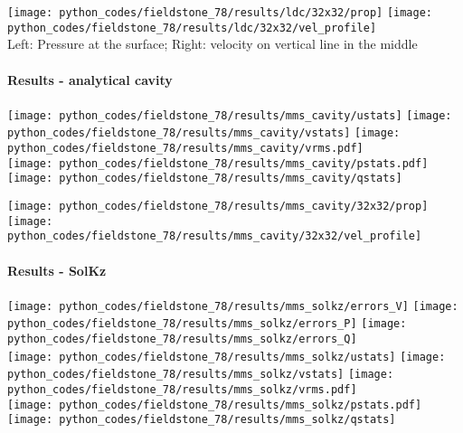 \begin{center}
\texttt{[image: python\_codes/fieldstone\_78/results/ldc/32x32/prop]}
\texttt{[image: python\_codes/fieldstone\_78/results/ldc/32x32/vel\_profile]}\\
{\captionfont Left: Pressure at the surface; Right: velocity on vertical line in the middle}
\end{center}

\newpage
\paragraph{Results - analytical cavity}

\begin{center}
\texttt{[image: python\_codes/fieldstone\_78/results/mms\_cavity/ustats]}
\texttt{[image: python\_codes/fieldstone\_78/results/mms\_cavity/vstats]}
\texttt{[image: python\_codes/fieldstone\_78/results/mms\_cavity/vrms.pdf]}\\
\texttt{[image: python\_codes/fieldstone\_78/results/mms\_cavity/pstats.pdf]}
\texttt{[image: python\_codes/fieldstone\_78/results/mms\_cavity/qstats]}
\end{center}

\begin{center}
\texttt{[image: python\_codes/fieldstone\_78/results/mms\_cavity/32x32/prop]}
\texttt{[image: python\_codes/fieldstone\_78/results/mms\_cavity/32x32/vel\_profile]}
\end{center}


\newpage
\paragraph{Results - SolKz}

\begin{center}
\texttt{[image: python\_codes/fieldstone\_78/results/mms\_solkz/errors\_V]}
\texttt{[image: python\_codes/fieldstone\_78/results/mms\_solkz/errors\_P]}
\texttt{[image: python\_codes/fieldstone\_78/results/mms\_solkz/errors\_Q]}\\
\texttt{[image: python\_codes/fieldstone\_78/results/mms\_solkz/ustats]}
\texttt{[image: python\_codes/fieldstone\_78/results/mms\_solkz/vstats]}
\texttt{[image: python\_codes/fieldstone\_78/results/mms\_solkz/vrms.pdf]}\\
\texttt{[image: python\_codes/fieldstone\_78/results/mms\_solkz/pstats.pdf]}
\texttt{[image: python\_codes/fieldstone\_78/results/mms\_solkz/qstats]}
\end{center}

